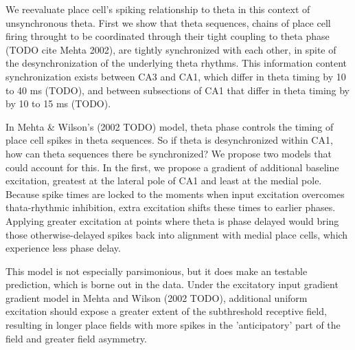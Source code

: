 \documentclass[10pt]{article}
\begin{document}
We reevaluate place cell's spiking relationship to theta in this context of unsynchronous theta. First we show that theta sequences, chains of place cell firing throught to be coordinated through their tight coupling to theta phase (TODO cite Mehta 2002), are tightly synchronized with each other, in spite of the desynchronization of the underlying theta rhythms. This information content synchronization exists between CA3 and CA1, which differ in theta timing by 10 to 40 ms (TODO), and between subsections of CA1 that differ in theta timing by by 10 to 15 ms (TODO).

In Mehta & Wilson's (2002 TODO) model, theta phase controls the timing of place cell spikes in theta sequences. So if theta is desynchronized within CA1, how can theta sequences there be synchronized? We propose two models that could account for this. In the first, we propose a gradient of additional baseline excitation, greatest at the lateral pole of CA1 and least at the medial pole. Because spike times are locked to the moments when input excitation overcomes thata-rhythmic inhibition, extra excitation shifts these times to earlier phases. Applying greater excitation at points where theta is phase delayed would bring those otherwise-delayed spikes back into alignment with medial place cells, which experience less phase delay.

This model is not especially parsimonious, but it does make an testable prediction, which is borne out in the data. Under the excitatory input gradient gradient model in Mehta and Wilson (2002 TODO), additional uniform excitation should expose a greater extent of the subthreshold receptive field, resulting in longer place fields with more spikes in the 'anticipatory' part of the field and greater field asymmetry. 
\end{document}
